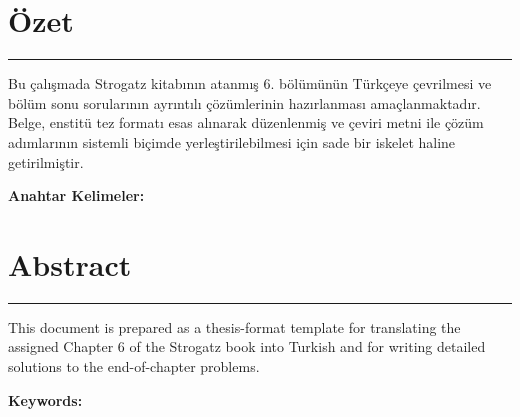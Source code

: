\chapter*{Özet}

\vspace{-0.6cm}
\rule{\textwidth}{0.3pt}\vspace{-0.35cm}

\begin{justify}
\begin{footnotesize}
Bu çalışmada Strogatz kitabının atanmış 6. bölümünün Türkçeye çevrilmesi ve bölüm sonu sorularının ayrıntılı çözümlerinin hazırlanması amaçlanmaktadır. Belge, enstitü tez formatı esas alınarak düzenlenmiş ve çeviri metni ile çözüm adımlarının sistemli biçimde yerleştirilebilmesi için sade bir iskelet haline getirilmiştir.

\textbf{Anahtar Kelimeler:} \anahtarkelimeler
\end{footnotesize}
\end{justify}

\chapter*{Abstract}

\vspace{-0.6cm}
\rule{\textwidth}{0.3pt}\vspace{-0.35cm}

\begin{justify}
\begin{footnotesize}
This document is prepared as a thesis-format template for translating the assigned Chapter 6 of the Strogatz book into Turkish and for writing detailed solutions to the end-of-chapter problems.

\textbf{Keywords:} \Keywords
\end{footnotesize}
\end{justify}
\newpage
